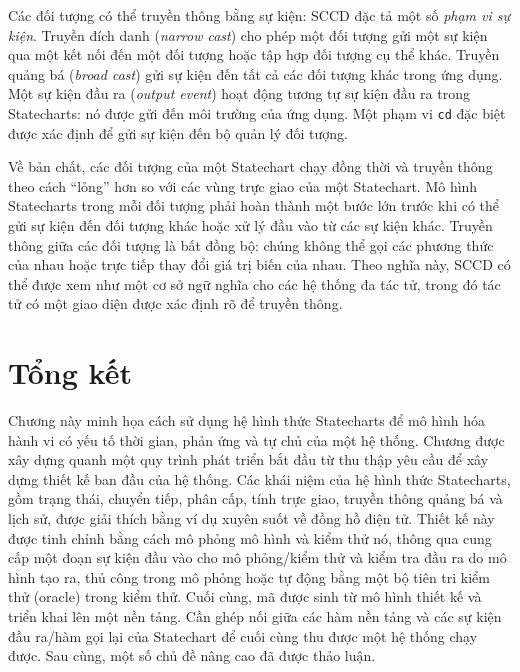 Các đối tượng có thể truyền thông bằng sự kiện: SCCD đặc tả một số \emph{phạm vi sự kiện}. Truyền đích danh (\emph{narrow cast}) cho phép một đối tượng gửi một sự kiện qua một kết nối đến một đối tượng hoặc tập hợp đối tượng cụ thể khác. Truyền quảng bá (\emph{broad cast}) gửi sự kiện đến tất cả các đối tượng khác trong ứng dụng. Một sự kiện đầu ra (\emph{output event}) hoạt động tương tự sự kiện đầu ra trong Statecharts: nó được gửi đến môi trường của ứng dụng. Một phạm vi \texttt{cd} đặc biệt được xác định để gửi sự kiện đến bộ quản lý đối tượng.

Về bản chất, các đối tượng của một Statechart chạy đồng thời và truyền thông theo cách ``lỏng'' hơn so với các vùng trực giao của một Statechart. Mô hình Statecharts trong mỗi đối tượng phải hoàn thành một bước lớn trước khi có thể gửi sự kiện đến đối tượng khác hoặc xử lý đầu vào từ các sự kiện khác. Truyền thông giữa các đối tượng là bất đồng bộ: chúng không thể gọi các phương thức của nhau hoặc trực tiếp thay đổi giá trị biến của nhau. Theo nghĩa này, SCCD có thể được xem như một cơ sở ngữ nghĩa cho các hệ thống đa tác tử, trong đó tác tử có một giao diện được xác định rõ để truyền thông.

\section{Tổng kết}
Chương này minh họa cách sử dụng hệ hình thức Statecharts để mô hình hóa hành vi có yếu tố thời gian, phản ứng và tự chủ của một hệ thống. Chương được xây dựng quanh một quy trình phát triển bắt đầu từ thu thập yêu cầu để xây dựng thiết kế ban đầu của hệ thống. Các khái niệm của hệ hình thức Statecharts, gồm trạng thái, chuyển tiếp, phân cấp, tính trực giao, truyền thông quảng bá và lịch sử, được giải thích bằng ví dụ xuyên suốt về đồng hồ điện tử. Thiết kế này được tinh chỉnh bằng cách mô phỏng mô hình và kiểm thử nó, thông qua cung cấp một đoạn sự kiện đầu vào cho mô phỏng/kiểm thử và kiểm tra đầu ra do mô hình tạo ra, thủ công trong mô phỏng hoặc tự động bằng một bộ tiên tri kiểm thử (oracle) trong kiểm thử. Cuối cùng, mã được sinh từ mô hình thiết kế và triển khai lên một nền tảng.
Cần ghép nối giữa các hàm nền tảng và các sự kiện đầu ra/hàm gọi lại của Statechart để cuối cùng thu được một hệ thống chạy được. Sau cùng, một số chủ đề nâng cao đã được thảo luận.


